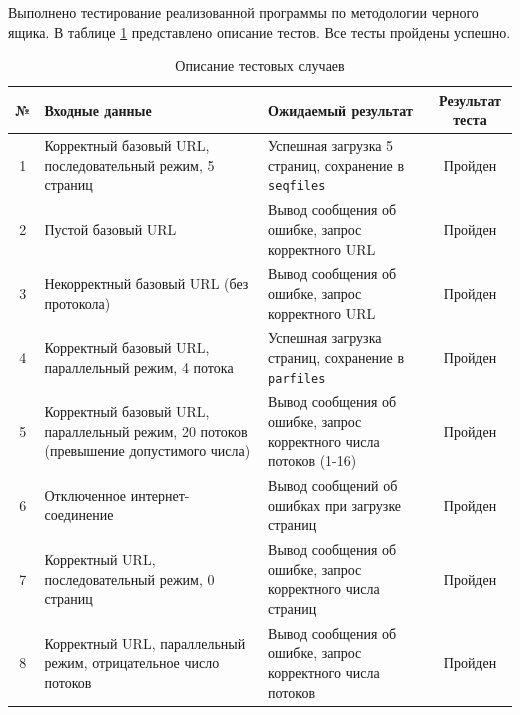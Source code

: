 Выполнено тестирование реализованной программы по методологии черного ящика. В таблице \ref{tbl:func} представлено описание тестов. Все тесты пройдены успешно.

\begin{table}[h!]
    \begin{center}
		\begin{threeparttable}
    \caption{Описание тестовых случаев}
    \captionsetup{justification=raggedright, singlelinecheck=false}
    \label{tbl:func}
    \begin{tabular}{|c|p{6cm}|p{6cm}|c|}
        \hline
        \textbf{№} & \textbf{Входные данные} & \textbf{Ожидаемый результат} & \textbf{Результат теста} \\
        \hline
        1 & Корректный базовый URL, последовательный режим, 5 страниц & Успешная загрузка 5 страниц, сохранение в \texttt{seqfiles} & Пройден \\
        \hline
        2 & Пустой базовый URL & Вывод сообщения об ошибке, запрос корректного URL & Пройден \\
        \hline
        3 & Некорректный базовый URL (без протокола) & Вывод сообщения об ошибке, запрос корректного URL & Пройден \\
        \hline
        4 & Корректный базовый URL, параллельный режим, 4 потока & Успешная загрузка страниц, сохранение в \texttt{parfiles} & Пройден \\
        \hline
        5 & Корректный базовый URL, параллельный режим, 20 потоков (превышение допустимого числа) & Вывод сообщения об ошибке, запрос корректного числа потоков (1-16) & Пройден \\
        \hline
        6 & Отключенное интернет-соединение & Вывод сообщений об ошибках при загрузке страниц & Пройден \\
        \hline
        7 & Корректный URL, последовательный режим, 0 страниц & Вывод сообщения об ошибке, запрос корректного числа страниц & Пройден \\
        \hline
        8 & Корректный URL, параллельный режим, отрицательное число потоков & Вывод сообщения об ошибке, запрос корректного числа потоков & Пройден \\
        \hline
    \end{tabular}
    \end{threeparttable}
    \end{center}
\end{table}

\clearpage

